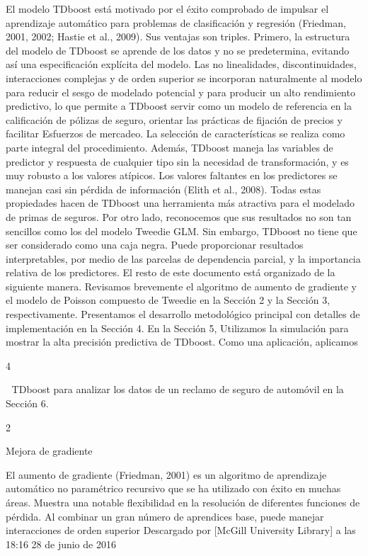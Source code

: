 \documentclass[]{article}
\begin{document}
El modelo TDboost está motivado por el éxito comprobado de impulsar el
aprendizaje automático para problemas de clasificación y regresión
(Friedman, 2001, 2002; Hastie et al., 2009). Sus ventajas son triples.
Primero, la estructura del modelo de TDboost se aprende de los datos y
no se predetermina, evitando así una especificación explícita del
modelo. Las no linealidades, discontinuidades, interacciones complejas y
de orden superior se incorporan naturalmente al modelo para reducir el
sesgo de modelado potencial y para producir un alto rendimiento
predictivo, lo que permite a TDboost servir como un modelo de referencia
en la calificación de pólizas de seguro, orientar las prácticas de
fijación de precios y facilitar Esfuerzos de mercadeo. La selección de
características se realiza como parte integral del procedimiento.
Además, TDboost maneja las variables de predictor y respuesta de
cualquier tipo sin la necesidad de transformación, y es muy robusto a
los valores atípicos. Los valores faltantes en los predictores se
manejan casi sin pérdida de información (Elith et al., 2008). Todas
estas propiedades hacen de TDboost una herramienta más atractiva para el
modelado de primas de seguros. Por otro lado, reconocemos que sus
resultados no son tan sencillos como los del modelo Tweedie GLM. Sin
embargo, TDboost no tiene que ser considerado como una caja negra. Puede
proporcionar resultados interpretables, por medio de las parcelas de
dependencia parcial, y la importancia relativa de los predictores. El
resto de este documento está organizado de la siguiente manera.
Revisamos brevemente el algoritmo de aumento de gradiente y el modelo de
Poisson compuesto de Tweedie en la Sección 2 y la Sección 3,
respectivamente. Presentamos el desarrollo metodológico principal con
detalles de implementación en la Sección 4. En la Sección 5, Utilizamos
la simulación para mostrar la alta precisión predictiva de TDboost. Como
una aplicación, aplicamos

4

 TDboost para analizar los datos de un reclamo de seguro de automóvil
en la Sección 6.

2

Mejora de gradiente

El aumento de gradiente (Friedman, 2001) es un algoritmo de aprendizaje
automático no paramétrico recursivo que se ha utilizado con éxito en
muchas áreas. Muestra una notable flexibilidad en la resolución de
diferentes funciones de pérdida. Al combinar un gran número de
aprendices base, puede manejar interacciones de orden superior
Descargado por {[}McGill University Library{]} a las 18:16 28 de junio
de 2016
\end{document}
